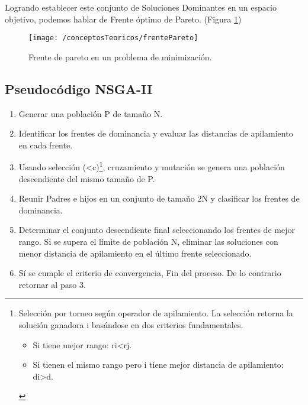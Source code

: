 Logrando establecer este conjunto de Soluciones Dominantes en un espacio objetivo, podemos hablar de Frente óptimo de Pareto. (Figura \ref{fig:frentePareto})

\begin{figure}[ht]
	\centering
	\texttt{[image: /conceptosTeoricos/frentePareto]}
	\caption{Frente de pareto en un problema de minimización.\cite{img:frente_pareto}}
	\label{fig:frentePareto}
\end{figure}

\subsection{Pseudocódigo NSGA-II \cite{pdf:nsga-ii}}

\begin{enumerate}
	\item Generar una población P de tamaño N. 
	\item Identificar los frentes de dominancia y evaluar las 
	distancias de apilamiento en cada frente. 
	\item Usando selección (<c)\footnote{Selección por torneo según operador de 
		apilamiento. La selección retorna la solución ganadora i basándose en 
		dos criterios fundamentales.  
		\begin{itemize}
			\item Si tiene mejor rango: ri<rj.
			\item Si tienen el mismo rango pero i tiene mejor distancia de apilamiento: di>d.
		\end{itemize}
	}, cruzamiento y mutación se 
	genera una población descendiente del mismo 
	tamaño de P.  	
	\item Reunir Padres e hijos en un conjunto de tamaño 2N y 
	clasificar los frentes de dominancia. 
	\item Determinar el conjunto descendiente final 
	seleccionando los frentes de mejor rango. Si se 
	supera el límite de población N, eliminar las 
	soluciones con menor distancia de apilamiento en el 
	último frente seleccionado. 
	\item Sí se cumple el criterio de convergencia, Fin del 
	proceso. De lo contrario retornar al paso 3.
\end{enumerate}